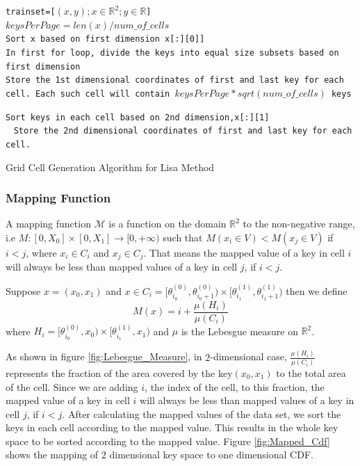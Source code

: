 \begin{algorithm}[H]
    \SetAlgoLined
     \texttt{trainset=[$(x,y);x \in \mathbb{R}^{2};y \in \mathbb{R}$]} \\
     \texttt{$keysPerPage =  len(x) / num\_of\_cells $}\\
     \texttt{Sort x based on first dimension x[:][0]]}\\
     \texttt{In first for loop, divide the keys into equal size subsets based on first dimension }\\
     {
        \texttt{Store the 1st dimensional coordinates of first and last key for each cell. Each such cell will contain $keysPerPage*sqrt(num\_of\_cells)$ keys } \\
     }
     
     \texttt{Sort keys in each cell based on 2nd dimension,x[:][1] }\\
     
      {
         \
         {
            \texttt{Store the 2nd dimensional coordinates of first and last key for each cell.} \\
		 }
      }
     \caption{Grid Cell Generation Algorithm for Lisa Method}
     \label{Training_Lisa_Baseline}
\end{algorithm}

\subsubsection{Mapping Function}
A mapping function $\mathcal{M}$ is a function on the domain $\mathbb{R}^{2}$ to the non-negative range, i.e $M:[0,X_{0}]\times[0,X_{1}]\to [0,+\infty)$ such that
    $ M(x_{i} \in V) <  M(x_{j} \in V)$ if $i<j$, where $x_{i} \in C_{i}$ and $x_{j} \in C_{j}$. That means the mapped value of a key in cell $i$ will always be less than mapped values of a key in cell $j$, if $i <j$. 
    
Suppose $x = (x_{0}, x_{1})$ and $x \in C_{i} = [\theta^{(0)}_{i_0},\theta^{(0)}_{i_0+1}) \times [\theta^{(1)}_{i_1},\theta^{(1)}_{i_1+1}) $ then we define 
$$M(x) = i+ \frac {\mu(H_{i})}{\mu(C_{i})} $$ where $H_{i} = [\theta^{(0)}_{i_0},x_{0}) \times [\theta^{(1)}_{i_1},x_{1}) $ and $\mu$ is the Lebesgue measure on $\mathbb{R}^2$.

As shown in figure \ref{fig:Lebesgue_Measure}, in $2$-dimensional case, $\frac {\mu(H_{i})}{\mu(C_{i})}$ represents the fraction of the area covered by the key$(x_{0}, x_{1})$ to the total area of the cell. Since we are adding $i$, the index of the cell, to this fraction, the mapped value of a key in cell $i$ will always be less than mapped values of a key in cell $j$, if $i<j$. After calculating the mapped values of the data set, we sort the keys in each cell according to the mapped value. This results in the whole key space to be sorted according to the mapped value. Figure \ref{fig:Mapped_Cdf} shows the mapping of $2$ dimensional key space to one dimensional CDF.

